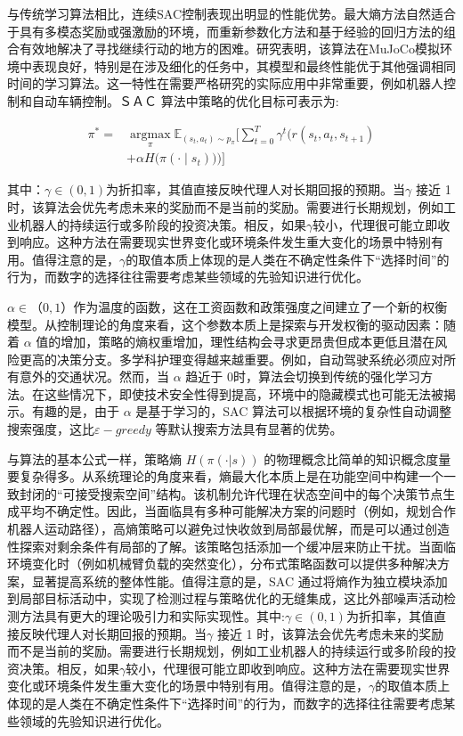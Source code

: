 与传统学习算法相比，连续SAC控制表现出明显的性能优势。最大熵方法自然适合于具有多模态奖励或强激励的环境，而重新参数化方法和基于经验的回归方法的组合有效地解决了寻找继续行动的地方的困难。研究表明，该算法在MuJoCo模拟环境中表现良好，特别是在涉及细化的任务中，其模型和最终性能优于其他强调相同时间的学习算法。这一特性在需要严格研究的实际应用中非常重要，例如机器人控制和自动车辆控制。ＳＡＣ 算法中策略的优化目标可表示为:

\begin{align}
	\pi^* =& \operatorname*{argmax}_{\pi} \mathbb{E}_{(s_t, a_t) \sim p_{\pi}} \Bigg[ \sum_{t=0}^T \gamma^t \bigg( r(s_t, a_t, s_{t+1}) \\
	&+ \alpha H\big(\pi({\cdot} \mid s_t)\big) \bigg) \Bigg]
\end{align}

其中：\(γ∈(0,1)\)为折扣率，其值直接反映代理人对长期回报的预期。当\(γ\) 接近 1 时，该算法会优先考虑未来的奖励而不是当前的奖励。需要进行长期规划，例如工业机器人的持续运行或多阶段的投资决策。相反，如果\(γ\)较小，代理很可能立即收到响应。这种方法在需要现实世界变化或环境条件发生重大变化的场景中特别有用。值得注意的是，\(γ\)的取值本质上体现的是人类在不确定性条件下“选择时间”的行为，而数字的选择往往需要考虑某些领域的先验知识进行优化。

\(α∈（0,1）\)作为温度的函数，这在工资函数和政策强度之间建立了一个新的权衡模型。从控制理论的角度来看，这个参数本质上是探索与开发权衡的驱动因素：随着 \(α\) 值的增加，策略的熵权重增加，理性结构会寻求更昂贵但成本更低且潜在风险更高的决策分支。多学科护理变得越来越重要。例如，自动驾驶系统必须应对所有意外的交通状况。然而，当  \(α\) 趋近于 0时，算法会切换到传统的强化学习方法。在这些情况下，即使技术安全性得到提高，环境中的隐藏模式也可能无法被揭示。有趣的是，由于 \(α\) 是基于学习的，SAC 算法可以根据环境的复杂性自动调整搜索强度，这比\(ε-greedy\) 等默认搜索方法具有显著的优势。

与算法的基本公式一样，策略熵 \(H(π(·|s))\) 的物理概念比简单的知识概念度量要复杂得多。从系统理论的角度来看，熵最大化本质上是在功能空间中构建一个一致封闭的“可接受搜索空间”结构。该机制允许代理在状态空间中的每个决策节点生成平均不确定性。因此，当面临具有多种可能解决方案的问题时（例如，规划合作机器人运动路径），高熵策略可以避免过快收敛到局部最优解，而是可以通过创造性探索对剩余条件有局部的了解。该策略包括添加一个缓冲层来防止干扰。当面临环境变化时（例如机械臂负载的突然变化），分布式策略函数可以提供多种解决方案，显著提高系统的整体性能。值得注意的是，SAC 通过将熵作为独立模块添加到局部目标活动中，实现了检测过程与策略优化的无缝集成，这比外部噪声活动检测方法具有更大的理论吸引力和实际实现性。其中:\(γ∈(0,1)\)为折扣率，其值直接反映代理人对长期回报的预期。当\(γ\) 接近 1 时，该算法会优先考虑未来的奖励而不是当前的奖励。需要进行长期规划，例如工业机器人的持续运行或多阶段的投资决策。相反，如果\(γ\)较小，代理很可能立即收到响应。这种方法在需要现实世界变化或环境条件发生重大变化的场景中特别有用。值得注意的是，\(γ\)的取值本质上体现的是人类在不确定性条件下“选择时间”的行为，而数字的选择往往需要考虑某些领域的先验知识进行优化。

